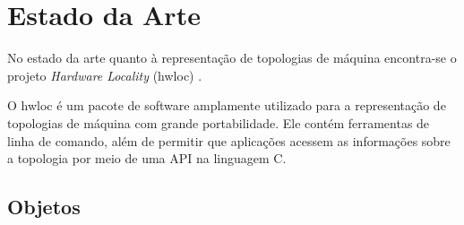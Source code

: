 \chapter{Estado da Arte} %
\label{cap:estado_da_arte}
\acresetall


No estado da arte quanto à representação de topologias de máquina encontra-se o projeto \textit{Hardware Locality} (hwloc) \cite{hwloc2010}.

O hwloc é um pacote de software amplamente utilizado para a representação de topologias de máquina com grande portabilidade.
Ele contém ferramentas de linha de comando, além de permitir que aplicações acessem as informações sobre a topologia por meio de uma API na linguagem C.



\section{Objetos}
\label{sec:objetos}

